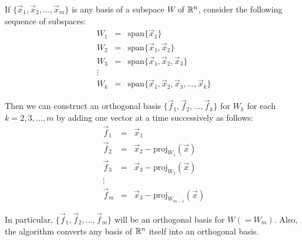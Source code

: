 \documentclass{ximera}
\begin{document}
%
\begin{theorem} \label{th:GS}
If $\{\vec{x}_{1}, \vec{x}_{2}, \dots , \vec{x}_{m}\}$ is any basis of a subspace $W$ of $\mathbb{R}^n$, consider the following sequence of subspaces:
\begin{equation*}
\begin{array}{ccl}
W_1&=&\mbox{span}\{\vec{x}_{1}\} \\
W_2&=&\mbox{span}\{\vec{x}_{1},\vec{x}_{2}\} \\
W_3&=&\mbox{span}\{\vec{x}_{1},\vec{x}_{2},\vec{x}_{3}\} \\
\vdots &&\\
W_k &=& \mbox{span}\{\vec{x}_{1},\vec{x}_{2},\vec{x}_{3},\ldots,\vec{x}_{k}\}
\end{array}
\end{equation*}

Then we can construct an orthogonal basis $\{\vec{f}_{1},\vec{f}_{2},\ldots,\vec{f}_{k}\}$ for $W_k$ for each $k = 2, 3, \dots , m$ by adding one vector at a time successively as follows:
\begin{equation*}
\begin{array}{ccl}
\vec{f}_{1} &=& \vec{x}_{1} \\
\vec{f}_{2} &=& \vec{x}_{2} - \mbox{proj}_{W_1}(\vec{x}) \\
\vec{f}_{3} &=& \vec{x}_{3} - \mbox{proj}_{W_2}(\vec{x}) \\
\vdots &&\\
\vec{f}_{m} &=& \vec{x}_{3} - \mbox{proj}_{W_{m-1}}(\vec{x})
\end{array}
\end{equation*}

In particular, $\{\vec{f}_{1},\vec{f}_{2},\ldots,\vec{f}_{m}\}$ will be an orthogonal basis for $W (= W_m)$.  Also, the algorithm converts any basis of $\mathbb{R}^n$ itself into an orthogonal basis.


\end{theorem}
\end{document}
